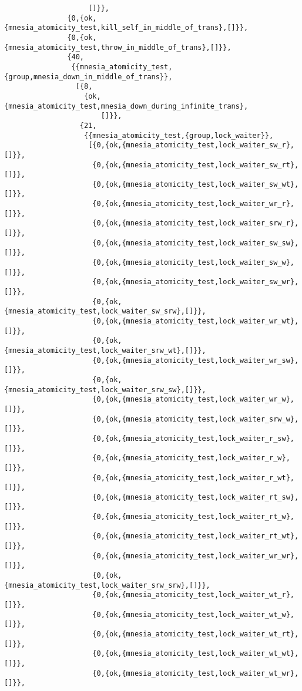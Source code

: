 \begin{verbatim}
                    []}},
               {0,{ok,{mnesia_atomicity_test,kill_self_in_middle_of_trans},[]}},
               {0,{ok,{mnesia_atomicity_test,throw_in_middle_of_trans},[]}},
               {40,
                {{mnesia_atomicity_test,{group,mnesia_down_in_middle_of_trans}},
                 [{8,
                   {ok,{mnesia_atomicity_test,mnesia_down_during_infinite_trans},
                       []}},
                  {21,
                   {{mnesia_atomicity_test,{group,lock_waiter}},
                    [{0,{ok,{mnesia_atomicity_test,lock_waiter_sw_r},[]}},
                     {0,{ok,{mnesia_atomicity_test,lock_waiter_sw_rt},[]}},
                     {0,{ok,{mnesia_atomicity_test,lock_waiter_sw_wt},[]}},
                     {0,{ok,{mnesia_atomicity_test,lock_waiter_wr_r},[]}},
                     {0,{ok,{mnesia_atomicity_test,lock_waiter_srw_r},[]}},
                     {0,{ok,{mnesia_atomicity_test,lock_waiter_sw_sw},[]}},
                     {0,{ok,{mnesia_atomicity_test,lock_waiter_sw_w},[]}},
                     {0,{ok,{mnesia_atomicity_test,lock_waiter_sw_wr},[]}},
                     {0,{ok,{mnesia_atomicity_test,lock_waiter_sw_srw},[]}},
                     {0,{ok,{mnesia_atomicity_test,lock_waiter_wr_wt},[]}},
                     {0,{ok,{mnesia_atomicity_test,lock_waiter_srw_wt},[]}},
                     {0,{ok,{mnesia_atomicity_test,lock_waiter_wr_sw},[]}},
                     {0,{ok,{mnesia_atomicity_test,lock_waiter_srw_sw},[]}},
                     {0,{ok,{mnesia_atomicity_test,lock_waiter_wr_w},[]}},
                     {0,{ok,{mnesia_atomicity_test,lock_waiter_srw_w},[]}},
                     {0,{ok,{mnesia_atomicity_test,lock_waiter_r_sw},[]}},
                     {0,{ok,{mnesia_atomicity_test,lock_waiter_r_w},[]}},
                     {0,{ok,{mnesia_atomicity_test,lock_waiter_r_wt},[]}},
                     {0,{ok,{mnesia_atomicity_test,lock_waiter_rt_sw},[]}},
                     {0,{ok,{mnesia_atomicity_test,lock_waiter_rt_w},[]}},
                     {0,{ok,{mnesia_atomicity_test,lock_waiter_rt_wt},[]}},
                     {0,{ok,{mnesia_atomicity_test,lock_waiter_wr_wr},[]}},
                     {0,{ok,{mnesia_atomicity_test,lock_waiter_srw_srw},[]}},
                     {0,{ok,{mnesia_atomicity_test,lock_waiter_wt_r},[]}},
                     {0,{ok,{mnesia_atomicity_test,lock_waiter_wt_w},[]}},
                     {0,{ok,{mnesia_atomicity_test,lock_waiter_wt_rt},[]}},
                     {0,{ok,{mnesia_atomicity_test,lock_waiter_wt_wt},[]}},
                     {0,{ok,{mnesia_atomicity_test,lock_waiter_wt_wr},[]}},

\end{verbatim}
